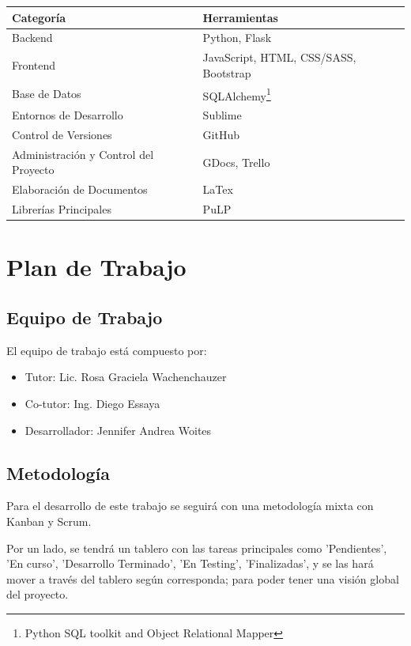 \documentclass[a4paper]{article}
\begin{document}
\begin{table}[htbp]
\begin{center}
\begin{tabular}{|l|l|}
\hline
\textbf{Categoría}				 			& 		\textbf{Herramientas} \\
\hline
Backend										&		Python, Flask \\
\hline
Frontend									&		JavaScript, HTML, CSS/SASS, Bootstrap \\
\hline
Base de Datos			 					&		SQLAlchemy\footnote{Python SQL toolkit and Object Relational Mapper} \\
\hline
Entornos de Desarrollo						& 		Sublime \\
\hline
Control de Versiones						& 		GitHub \\
\hline
Administración y Control del Proyecto		& 		GDocs, Trello \\
\hline
Elaboración de Documentos					& 		LaTex \\
\hline
Librerías Principales						& 		PuLP \\
\hline
\end{tabular}
\end{center}
\end{table}

\section{Plan de Trabajo}

\subsection{Equipo de Trabajo}

El equipo de trabajo está compuesto por:

\begin{itemize}
	\item Tutor: Lic. Rosa Graciela Wachenchauzer
	\item Co-tutor: Ing. Diego Essaya
	\item Desarrollador: Jennifer Andrea Woites
\end{itemize}

\subsection{Metodología}

Para el desarrollo de este trabajo se seguirá con una metodología mixta con Kanban y Scrum.

Por un lado, se tendrá un tablero con las tareas principales como 'Pendientes', 'En curso', 'Desarrollo Terminado', 'En Testing', 'Finalizadas', y se las hará mover a través del tablero según corresponda; para poder tener una visión global del proyecto.
\end{document}
